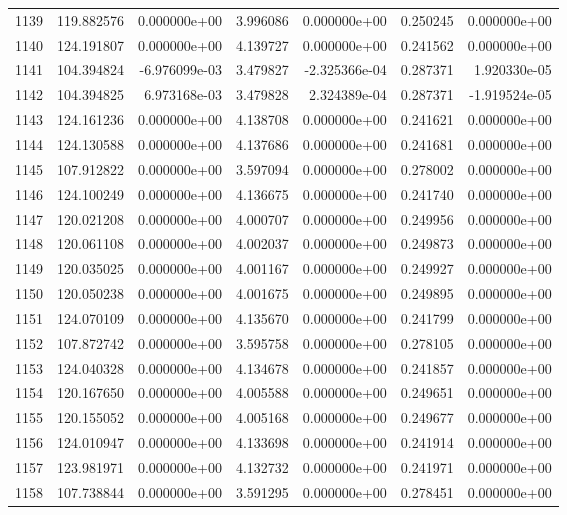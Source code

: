 \begin{tabular}{rrrrrrr}
1139 & 119.882576 &  0.000000e+00 &  3.996086 &  0.000000e+00 &    0.250245 &  0.000000e+00 \\
1140 & 124.191807 &  0.000000e+00 &  4.139727 &  0.000000e+00 &    0.241562 &  0.000000e+00 \\
1141 & 104.394824 & -6.976099e-03 &  3.479827 & -2.325366e-04 &    0.287371 &  1.920330e-05 \\
1142 & 104.394825 &  6.973168e-03 &  3.479828 &  2.324389e-04 &    0.287371 & -1.919524e-05 \\
1143 & 124.161236 &  0.000000e+00 &  4.138708 &  0.000000e+00 &    0.241621 &  0.000000e+00 \\
1144 & 124.130588 &  0.000000e+00 &  4.137686 &  0.000000e+00 &    0.241681 &  0.000000e+00 \\
1145 & 107.912822 &  0.000000e+00 &  3.597094 &  0.000000e+00 &    0.278002 &  0.000000e+00 \\
1146 & 124.100249 &  0.000000e+00 &  4.136675 &  0.000000e+00 &    0.241740 &  0.000000e+00 \\
1147 & 120.021208 &  0.000000e+00 &  4.000707 &  0.000000e+00 &    0.249956 &  0.000000e+00 \\
1148 & 120.061108 &  0.000000e+00 &  4.002037 &  0.000000e+00 &    0.249873 &  0.000000e+00 \\
1149 & 120.035025 &  0.000000e+00 &  4.001167 &  0.000000e+00 &    0.249927 &  0.000000e+00 \\
1150 & 120.050238 &  0.000000e+00 &  4.001675 &  0.000000e+00 &    0.249895 &  0.000000e+00 \\
1151 & 124.070109 &  0.000000e+00 &  4.135670 &  0.000000e+00 &    0.241799 &  0.000000e+00 \\
1152 & 107.872742 &  0.000000e+00 &  3.595758 &  0.000000e+00 &    0.278105 &  0.000000e+00 \\
1153 & 124.040328 &  0.000000e+00 &  4.134678 &  0.000000e+00 &    0.241857 &  0.000000e+00 \\
1154 & 120.167650 &  0.000000e+00 &  4.005588 &  0.000000e+00 &    0.249651 &  0.000000e+00 \\
1155 & 120.155052 &  0.000000e+00 &  4.005168 &  0.000000e+00 &    0.249677 &  0.000000e+00 \\
1156 & 124.010947 &  0.000000e+00 &  4.133698 &  0.000000e+00 &    0.241914 &  0.000000e+00 \\
1157 & 123.981971 &  0.000000e+00 &  4.132732 &  0.000000e+00 &    0.241971 &  0.000000e+00 \\
1158 & 107.738844 &  0.000000e+00 &  3.591295 &  0.000000e+00 &    0.278451 &  0.000000e+00 \\

\end{tabular}
